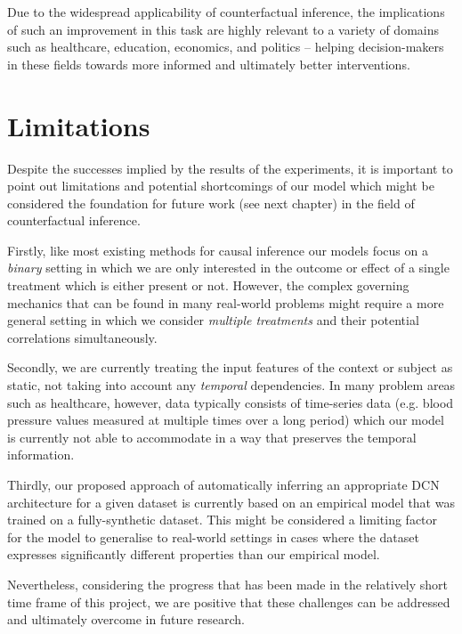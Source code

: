 Due to the widespread applicability of counterfactual inference, the implications of such an  improvement in this task are highly relevant to a variety of domains such as healthcare, education, economics, and politics -- helping decision-makers in these fields towards more informed and ultimately better interventions. 

\section{Limitations}
Despite the successes implied by the results of the experiments, it is important to point out limitations and potential shortcomings of our model which might be considered the foundation for future work (see next chapter) in the field of counterfactual inference. 

Firstly, like most existing methods for causal inference our models focus on a \emph{binary} setting in which we are only interested in the outcome or effect of a single treatment which is either present or not. However, the complex governing mechanics that can be found in many real-world problems might require a more general setting in which we consider \emph{multiple treatments} and their potential correlations simultaneously.

Secondly, we are currently treating the input features of the context or subject as static, not taking into account any \emph{temporal} dependencies. In many problem areas such as healthcare, however, data typically consists of time-series data (e.g. blood pressure values measured at multiple times over a long period) which our model is currently not able to accommodate in a way that preserves the temporal information. 

Thirdly, our proposed approach of automatically inferring an appropriate DCN architecture for a given dataset is currently based on an empirical model that was trained on a fully-synthetic dataset. This might be considered a limiting factor for the model to generalise to real-world settings in cases where the dataset expresses significantly different properties than our empirical model.  

Nevertheless, considering the progress that has been made in the relatively short time frame of this project, we are positive that these challenges can be addressed and ultimately overcome in future research.


%


